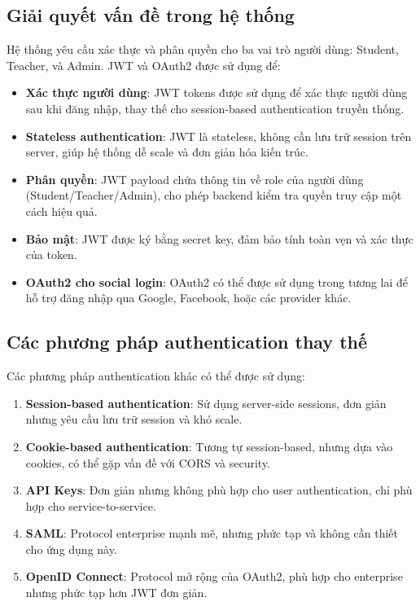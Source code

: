 \documentclass[../DoAn.tex]{subfiles}
\begin{document}
\subsection{Giải quyết vấn đề trong hệ thống}

Hệ thống yêu cầu xác thực và phân quyền cho ba vai trò người dùng: Student, Teacher, và Admin. JWT và OAuth2 được sử dụng để:

\begin{itemize}
    \item \textbf{Xác thực người dùng}: JWT tokens được sử dụng để xác thực người dùng sau khi đăng nhập, thay thế cho session-based authentication truyền thống.
    
    \item \textbf{Stateless authentication}: JWT là stateless, không cần lưu trữ session trên server, giúp hệ thống dễ scale và đơn giản hóa kiến trúc.
    
    \item \textbf{Phân quyền}: JWT payload chứa thông tin về role của người dùng (Student/Teacher/Admin), cho phép backend kiểm tra quyền truy cập một cách hiệu quả.
    
    \item \textbf{Bảo mật}: JWT được ký bằng secret key, đảm bảo tính toàn vẹn và xác thực của token.
    
    \item \textbf{OAuth2 cho social login}: OAuth2 có thể được sử dụng trong tương lai để hỗ trợ đăng nhập qua Google, Facebook, hoặc các provider khác.
\end{itemize}

\subsection{Các phương pháp authentication thay thế}

Các phương pháp authentication khác có thể được sử dụng:

\begin{enumerate}
    \item \textbf{Session-based authentication}: Sử dụng server-side sessions, đơn giản nhưng yêu cầu lưu trữ session và khó scale.
    
    \item \textbf{Cookie-based authentication}: Tương tự session-based, nhưng dựa vào cookies, có thể gặp vấn đề với CORS và security.
    
    \item \textbf{API Keys}: Đơn giản nhưng không phù hợp cho user authentication, chỉ phù hợp cho service-to-service.
    
    \item \textbf{SAML}: Protocol enterprise mạnh mẽ, nhưng phức tạp và không cần thiết cho ứng dụng này.
    
    \item \textbf{OpenID Connect}: Protocol mở rộng của OAuth2, phù hợp cho enterprise nhưng phức tạp hơn JWT đơn giản.
\end{enumerate}
\end{document}

